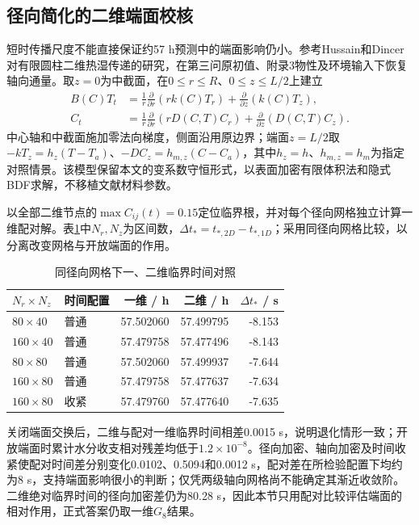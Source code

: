 \subsection{径向简化的二维端面校核}\label{sec_axisymmetric}
短时传播尺度不能直接保证约57 h预测中的端面影响仍小。参考Hussain和Dincer对有限圆柱二维热湿传递的研究\cite{hussain2003}，在第三问原初值、附录3物性及环境输入下恢复轴向通量。取$z=0$为中截面，在$0\le r\le R$、$0\le z\le L/2$上建立
\begin{equation}\label{eq_q3_2d}
\begin{aligned}
B(C)T_t&=\frac1r\frac{\partial}{\partial r}\left(rk(C)T_r\right)
       +\frac{\partial}{\partial z}\left(k(C)T_z\right),\\
C_t&=\frac1r\frac{\partial}{\partial r}\left(rD(C,T)C_r\right)
       +\frac{\partial}{\partial z}\left(D(C,T)C_z\right).
\end{aligned}
\end{equation}
中心轴和中截面施加零法向梯度，侧面沿用原边界；端面$z=L/2$取$-kT_z=h_z(T-T_a)$、$-DC_z=h_{m,z}(C-C_a)$，其中$h_z=h$、$h_{m,z}=h_m$为指定对照情景。该模型保留本文的变系数守恒形式，以表面加密有限体积法和隐式BDF求解，不移植文献材料参数。

以全部二维节点的$\max C_{ij}(t)=0.15$定位临界根，并对每个径向网格独立计算一维配对解。表\ref{tab_axisymmetric}中$N_r,N_z$为区间数，$\Delta t_*=t_{*,2D}-t_{*,1D}$；采用同径向网格比较，以分离改变网格与开放端面的作用。
\begin{table}[htbp]\centering\small
\caption{同径向网格下一、二维临界时间对照}\label{tab_axisymmetric}
\begin{tabular}{llrrr}\toprule
$N_r\times N_z$ & 时间配置 & 一维 / h & 二维 / h & $\Delta t_*$ / s\\\midrule
$80\times40$ & 普通 & 57.502060 & 57.499795 & -8.153\\
$160\times40$ & 普通 & 57.479758 & 57.477496 & -8.143\\
$80\times80$ & 普通 & 57.502060 & 57.499937 & -7.644\\
$160\times80$ & 普通 & 57.479758 & 57.477637 & -7.634\\
$160\times80$ & 收紧 & 57.479760 & 57.477640 & -7.635\\\bottomrule
\end{tabular}
\end{table}

关闭端面交换后，二维与配对一维临界时间相差0.0015 s，说明退化情形一致；开放端面时累计水分收支相对残差均低于$1.2\times10^{-8}$。径向加密、轴向加密及时间收紧使配对时间差分别变化0.0102、0.5094和0.0012 s，配对差在所检验配置下均约为8 s，支持端面影响很小的判断；仅凭两级轴向网格尚不能确定其渐近收敛阶。二维绝对临界时间的径向加密差仍为80.28 s，因此本节只用配对比较评估端面的相对作用，正式答案仍取一维$G_8$结果。

